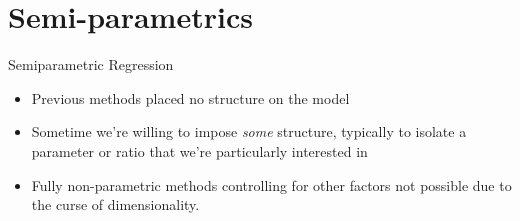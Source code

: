 %
\section{Semi-parametrics}

\begin{frame}{Semiparametric Regression}
  \begin{itemize}
    \item Previous methods placed no structure on the model
    \item Sometime we're willing to impose \textit{some} structure, typically to isolate a parameter or ratio that we're particularly interested in
    \item Fully non-parametric methods controlling for other factors not possible due to the curse of dimensionality. 
  \end{itemize}
\end{frame}

